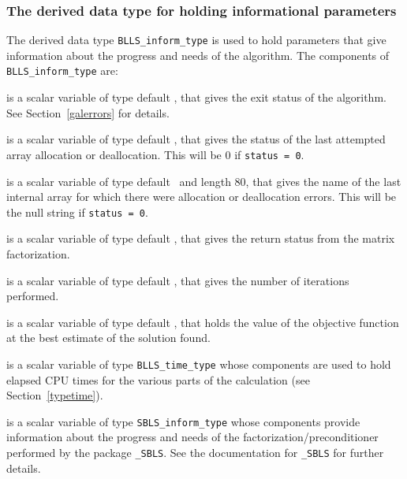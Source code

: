 \documentclass{galahad}
\newcommand{\packagename}{BLLS}
\begin{document}

\subsubsection{The derived data type for holding informational
 parameters}\label{typeinform}
The derived data type
{\tt \packagename\_inform\_type}
is used to hold parameters that give information about the progress and needs
of the algorithm. The components of
{\tt \packagename\_inform\_type}
are:

\begin{description}

 is a scalar variable of type default \integer, that gives the
exit status of the algorithm.
See Section~\ref{galerrors}
for details.

 is a scalar variable of type default \integer, that gives
the status of the last attempted array allocation or deallocation.
This will be 0 if {\tt status = 0}.

 is a scalar variable of type default \character\
and length 80, that  gives the name of the last internal array
for which there were allocation or deallocation errors.
This will be the null string if {\tt status = 0}.

 is a scalar variable of type default \integer, that
gives the return status from the matrix factorization.

 is a scalar variable of type default \integer, that
gives the number of iterations performed.

 is a scalar variable of type default \realdp, that holds the
value of the objective function at the best estimate of the solution found.

 is a scalar variable of type {\tt \packagename\_time\_type}
whose components are used to hold elapsed CPU times for the various parts
of the calculation (see Section~\ref{typetime}).

 is a scalar variable of type
{\tt SBLS\_inform\_type} %
whose components provide information about the progress and needs
of the factorization/preconditioner
performed by the package
{\tt \libraryname\_SBLS}.
See the documentation for {\tt \libraryname\_SBLS} for further details.

\end{description}
\end{document}
